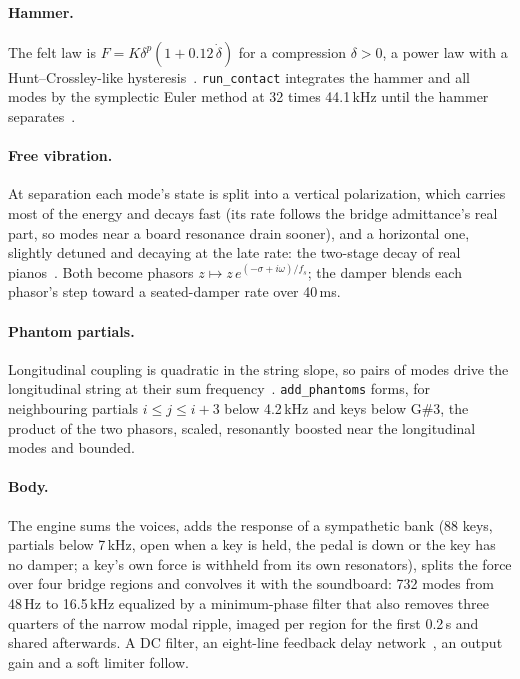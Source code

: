 \documentclass[10pt,a4paper,twocolumn]{article}
\newcommand{\code}[1]{\texttt{#1}}
\begin{document}
\paragraph{Hammer.} The felt law is $F = K\delta^p(1 + 0.12\,\dot\delta)$ for a compression $\delta > 0$, a power law with a Hunt--Crossley-like hysteresis~\cite{hunt1975,stulov1995}. \code{run\_contact} integrates the hammer and all modes by the symplectic Euler method at 32 times 44.1\,kHz until the hammer separates~\cite{chaigne1994}.

\paragraph{Free vibration.} At separation each mode's state is split into a vertical polarization, which carries most of the energy and decays fast (its rate follows the bridge admittance's real part, so modes near a board resonance drain sooner), and a horizontal one, slightly detuned and decaying at the late rate: the two-stage decay of real pianos~\cite{weinreich1977}. Both become phasors $z \mapsto z\,e^{(-\sigma + i\omega)/f_s}$; the damper blends each phasor's step toward a seated-damper rate over 40\,ms.

\paragraph{Phantom partials.} Longitudinal coupling is quadratic in the string slope, so pairs of modes drive the longitudinal string at their sum frequency~\cite{conklin1999,bank2005}. \code{add\_phantoms} forms, for neighbouring partials $i \le j \le i+3$ below 4.2\,kHz and keys below G\#3, the product of the two phasors, scaled, resonantly boosted near the longitudinal modes and bounded.

\paragraph{Body.} The engine sums the voices, adds the response of a sympathetic bank (88 keys, partials below 7\,kHz, open when a key is held, the pedal is down or the key has no damper; a key's own force is withheld from its own resonators), splits the force over four bridge regions and convolves it with the soundboard: 732 modes from 48\,Hz to 16.5\,kHz equalized by a minimum-phase filter that also removes three quarters of the narrow modal ripple, imaged per region for the first 0.2\,s and shared afterwards. A DC filter, an eight-line feedback delay network~\cite{jot1991}, an output gain and a soft limiter follow.
\end{document}
